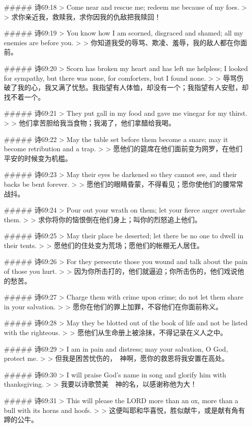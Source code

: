 ##### 诗69:18
> Come near and rescue me; redeem me because of my foes.
>
> 求你亲近我，救赎我，求你因我的仇敌把我赎回！


##### 诗69:19
> You know how I am scorned, disgraced and shamed; all my enemies are before you.
>
> 你知道我受的辱骂、欺凌、羞辱，我的敌人都在你面前。


##### 诗69:20
> Scorn has broken my heart and has left me helpless; I looked for sympathy, but there was none, for comforters, but I found none.
>
> 辱骂伤破了我的心，我又满了忧愁。我指望有人体恤，却没有一个；我指望有人安慰，却找不着一个。


##### 诗69:21
> They put gall in my food and gave me vinegar for my thirst.
>
> 他们拿苦胆给我当食物；我渴了，他们拿醋给我喝。


##### 诗69:22
> May the table set before them become a snare; may it become retribution and a trap.
>
> 愿他们的筵席在他们面前变为网罗，在他们平安的时候变为机槛。


##### 诗69:23
> May their eyes be darkened so they cannot see, and their backs be bent forever.
>
> 愿他们的眼睛昏蒙，不得看见；愿你使他们的腰常常战抖。


##### 诗69:24
> Pour out your wrath on them; let your fierce anger overtake them.
>
> 求你将你的恼恨倒在他们身上；叫你的烈怒追上他们。


##### 诗69:25
> May their place be deserted; let there be no one to dwell in their tents.
>
> 愿他们的住处变为荒场；愿他们的帐棚无人居住。


##### 诗69:26
> For they persecute those you wound and talk about the pain of those you hurt.
>
> 因为你所击打的，他们就逼迫；你所击伤的，他们戏说他的愁苦。


##### 诗69:27
> Charge them with crime upon crime; do not let them share in your salvation.
>
> 愿你在他们的罪上加罪，不容他们在你面前称义。


##### 诗69:28
> May they be blotted out of the book of life and not be listed with the righteous.
>
> 愿他们从生命册上被涂抹，不得记录在义人之中。


##### 诗69:29
> I am in pain and distress; may your salvation, O God, protect me.
>
> 但我是困苦忧伤的，　神啊，愿你的救恩将我安置在高处。


##### 诗69:30
> I will praise God's name in song and glorify him with thanksgiving.
>
> 我要以诗歌赞美　神的名，以感谢称他为大！


##### 诗69:31
> This will please the LORD more than an ox, more than a bull with its horns and hoofs.
>
> 这便叫耶和华喜悦，胜似献牛，或是献有角有蹄的公牛。


